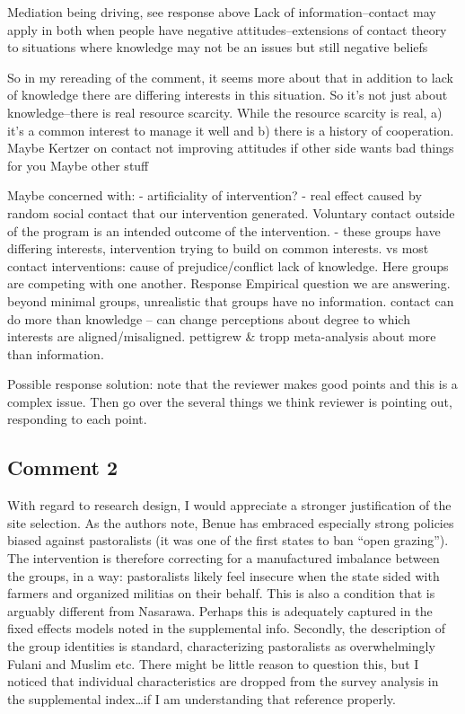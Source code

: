 \documentclass[
]{article}
\begin{document}
Mediation being driving, see response above Lack of information--contact
may apply in both when people have negative attitudes--extensions of
contact theory to situations where knowledge may not be an issues but
still negative beliefs

So in my rereading of the comment, it seems more about that in addition
to lack of knowledge there are differing interests in this situation. So
it's not just about knowledge--there is real resource scarcity. While
the resource scarcity is real, a) it's a common interest to manage it
well and b) there is a history of cooperation. Maybe Kertzer on contact
not improving attitudes if other side wants bad things for you Maybe
other stuff

Maybe concerned with: - artificiality of intervention? - real effect
caused by random social contact that our intervention generated.
Voluntary contact outside of the program is an intended outcome of the
intervention. - these groups have differing interests, intervention
trying to build on common interests. vs most contact interventions:
cause of prejudice/conflict lack of knowledge. Here groups are competing
with one another. Response Empirical question we are answering. beyond
minimal groups, unrealistic that groups have no information. contact can
do more than knowledge -- can change perceptions about degree to which
interests are aligned/misaligned. pettigrew \& tropp meta-analysis about
more than information.

Possible response solution: note that the reviewer makes good points and
this is a complex issue. Then go over the several things we think
reviewer is pointing out, responding to each point.

\hypertarget{comment-2-1}{%
\subsection{Comment 2}\label{comment-2-1}}

With regard to research design, I would appreciate a stronger
justification of the site selection. As the authors note, Benue has
embraced especially strong policies biased against pastoralists (it was
one of the first states to ban ``open grazing''). The intervention is
therefore correcting for a manufactured imbalance between the groups, in
a way: pastoralists likely feel insecure when the state sided with
farmers and organized militias on their behalf. This is also a condition
that is arguably different from Nasarawa. Perhaps this is adequately
captured in the fixed effects models noted in the supplemental info.
Secondly, the description of the group identities is standard,
characterizing pastoralists as overwhelmingly Fulani and Muslim etc.
There might be little reason to question this, but I noticed that
individual characteristics are dropped from the survey analysis in the
supplemental index\ldots if I am understanding that reference properly.
\end{document}
